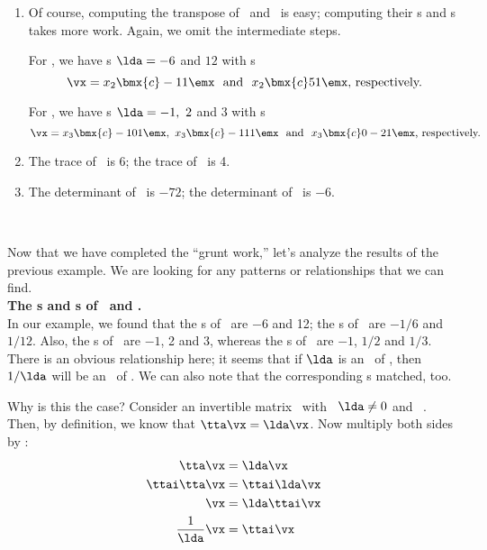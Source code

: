 {\begin{enumerate}
	\item		Of course, computing the transpose of \tta\ and \ttb\ is easy; computing their \el s and \ev s takes more work. Again, we omit the intermediate steps.
	
	For \ttat, we have \el s $\lda = -6$ and $12$ with \ev s 
\[
\vx = x_2 \bmx{c} -1\\1\emx\ \text{ and }\  x_2 \bmx{c} 5\\1\emx \text{, respectively.}
\]
	
	For \ttbt, we have \el s $\lda = -1,\ 2$ and $3$ with \ev s 
\[
\vx = x_3 \bmx{c} -1\\0\\1\emx,\ x_3 \bmx{c} -1\\1\\1\emx\ \text{ and }\ x_3\bmx{c} 0\\-2\\1\emx\text{, respectively.}
\]
	
	\item		The trace of \tta\ is 6; the trace of \ttb\ is 4.
	
	\item		The determinant of \tta\ is $-72$; the determinant of \ttb\ is $-6$.
	
\end{enumerate}
\ }

\medskip

Now that we have completed the ``grunt work,'' let's analyze the results of the previous example. We are looking for any patterns or relationships that we can find.\\

\noindent \textsf{\textbf{The \el s and \ev s of \tta\ and \ttai.}} \\

In our example, we found that the \el s of \tta\ are $-6$ and 12; the \el s of \ttai\ are $-1/6$ and $1/12$. Also, the \el s of \ttb\ are $-1$, 2 and 3, whereas the \el s of \ttbi\ are $-1$, $1/2$ and $1/3$. There is an obvious relationship here; it seems that if $\lda$ is an \el\ of \tta, then $1/\lda$ will be an \el\ of \ttai. We can also note that the corresponding \ev s matched, too.

Why is this the case? Consider an invertible matrix \tta\ with \el\ $\lda\neq 0$ and \ev\ \vx. Then, by definition, we know that $\tta\vx = \lda\vx$. Now multiply both sides by \ttai:
\begin{align*}
\tta\vx & = \lda\vx \\
\ttai\tta\vx & = \ttai\lda\vx \\
\vx & = \lda\ttai\vx \\
\frac{1}{\lda}\vx & = \ttai\vx 
\end{align*}

